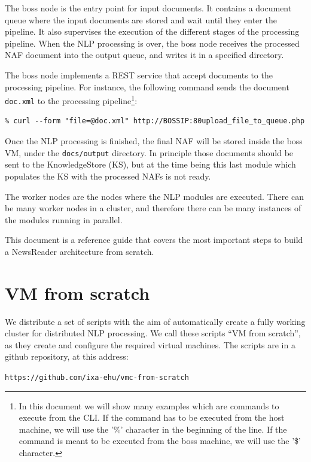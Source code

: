 \documentclass[a4]{article}
\begin{document}
The boss node is the entry point for input documents. It contains a document
queue where the input documents are stored and wait until they enter the
pipeline. It also supervises the execution of the different stages of the
processing pipeline. When the NLP processing is over, the boss node receives
the processed NAF document into the output queue, and writes it in a
specified directory.

The boss node implements a REST service that accept documents to the
processing pipeline. For instance, the following command sends the document
\texttt{doc.xml} to the processing pipeline\footnote{In this document we
  will show many examples which are commands to execute from the CLI. If the
  command has to be executed from the host machine, we will use the '\%'
  character in the beginning of the line. If the command is meant to be
  executed from the boss machine, we will use the '\$' character.}:

\begin{verbatim}
% curl --form "file=@doc.xml" http://BOSSIP:80upload_file_to_queue.php
\end{verbatim}

Once the NLP processing is finished, the final NAF will be stored inside the
boss VM, under the \texttt{docs/output} directory. In principle those
documents should be sent to the KnowledgeStore (KS), but at the time being
this last module which populates the KS with the processed NAFs is not
ready.

The worker nodes are the nodes where the NLP modules are executed. There can
be many worker nodes in a cluster, and therefore there can be many instances
of the modules running in parallel.

This document is a reference guide that covers the most important steps to
build a NewsReader architecture from scratch.

\section{VM from scratch}
\label{sec:vm-from-scratch}

We distribute a set of scripts with the aim of automatically create a fully
working cluster for distributed NLP processing. We call these scripts ``VM
from scratch'', as they create and configure the required virtual
machines. The scripts are in a github repository, at this address:

\begin{center}
  \texttt{https://github.com/ixa-ehu/vmc-from-scratch}
\end{center}
\end{document}
